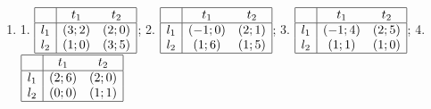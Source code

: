 \begin{problem}
\begin{enumerate}
\item	1.  $\begin{array}{|c|cc|}  \hline {} & {t_{1} } & {t_{2} } \\  \hline {l_{1} } & {\left(3;2\right)} & {\left(2;0\right)} \\ {l_{2} } & {\left(1;0\right)} & {\left(3;5\right)} \\  \hline  \end{array}$; 2.  $\begin{array}{|c|cc|}  \hline {} & {t_{1} } & {t_{2} } \\  \hline {l_{1} } & {\left(-1;0\right)} & {\left(2;1\right)} \\ {l_{2} } & {\left(1;6\right)} & {\left(1;5\right)} \\  \hline  \end{array}$; 3.  $\begin{array}{|c|cc|}  \hline {} & {t_{1} } & {t_{2} } \\  \hline {l_{1} } & {\left(-1;4\right)} & {\left(2;5\right)} \\ {l_{2} } & {\left(1;1\right)} & {\left(1;0\right)} \\  \hline  \end{array}$; 4.  $\begin{array}{|c|cc|}  \hline {} & {t_{1} } & {t_{2} } \\  \hline {l_{1} } & {\left(2;6\right)} & {\left(2;0\right)} \\ {l_{2} } & {\left(0;0\right)} & {\left(1;1\right)} \\  \hline  \end{array}$ \\

\end{enumerate}
\end{problem}
